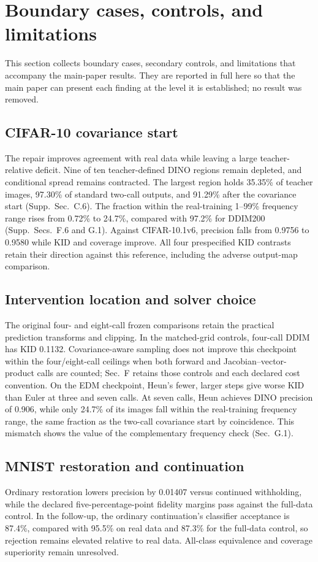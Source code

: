 \section{Boundary cases, controls, and limitations}
\label{supp:boundary}
This section collects boundary cases, secondary controls, and limitations
that accompany the main-paper results. They are reported in full here so
that the main paper can present each finding at the level it is
established; no result was removed.

\subsection{CIFAR-10 covariance start}
\label{supp:boundary-cifar}
The repair improves agreement with real data while leaving a large
teacher-relative deficit. Nine of ten teacher-defined DINO regions
remain depleted, and conditional spread remains contracted. The largest
region holds 35.35\% of teacher images, 97.30\% of standard two-call
outputs, and 91.29\% after the covariance start (Supp.~Sec.~C.6). The
fraction within the real-training 1--99\% frequency range rises from
0.72\% to 24.7\%, compared with 97.2\% for DDIM200 (Supp.~Secs.~F.6 and G.1).
Against CIFAR-10.1v6, precision falls from 0.9756 to 0.9580 while KID and
coverage improve. All four prespecified KID contrasts retain their
direction against this reference, including the adverse output-map
comparison.

\subsection{Intervention location and solver choice}
\label{supp:boundary-solver}
The original four- and eight-call frozen comparisons retain the practical
prediction transforms and clipping. In the matched-grid controls,
four-call DDIM has KID 0.1132. Covariance-aware sampling does not improve
this checkpoint within the four/eight-call ceilings when both forward and
Jacobian--vector-product calls are counted; Sec.~F retains those controls
and each declared cost convention. On the EDM checkpoint, Heun's fewer,
larger steps give worse KID than Euler at three and seven calls. At seven
calls, Heun achieves DINO precision of 0.906, while only 24.7\% of its
images fall within the real-training frequency range, the same fraction
as the two-call covariance start by coincidence. This mismatch shows the
value of the complementary frequency check (Sec.~G.1).

\subsection{MNIST restoration and continuation}
\label{supp:boundary-mnist}
Ordinary restoration lowers precision by 0.01407 versus continued
withholding, while the declared five-percentage-point fidelity margins
pass against the full-data control. In the follow-up, the ordinary
continuation's classifier acceptance is 87.4\%, compared with 95.5\% on
real data and 87.3\% for the full-data control, so rejection remains
elevated relative to real data. All-class equivalence and coverage
superiority remain unresolved.

